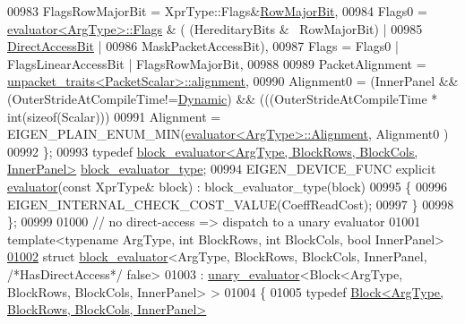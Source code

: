 \begin{DoxyCode}
00983     FlagsRowMajorBit = XprType::Flags&\hyperlink{group__flags_gae4f56c2a60bbe4bd2e44c5b19cbe8762}{RowMajorBit},
00984     Flags0 = \hyperlink{struct_eigen_1_1internal_1_1evaluator}{evaluator<ArgType>::Flags} & ( (HereditaryBits & ~RowMajorBit) |
00985                                            \hyperlink{group__flags_gabf1e9d0516a933445a4c307ad8f14915}{DirectAccessBit} |
00986                                            MaskPacketAccessBit),
00987     Flags = Flags0 | FlagsLinearAccessBit | FlagsRowMajorBit,
00988     
00989     PacketAlignment = \hyperlink{struct_eigen_1_1internal_1_1unpacket__traits}{unpacket\_traits<PacketScalar>::alignment},
00990     Alignment0 = (InnerPanel && (OuterStrideAtCompileTime!=\hyperlink{namespace_eigen_ad81fa7195215a0ce30017dfac309f0b2}{Dynamic}) && (((OuterStrideAtCompileTime *
       int(\textcolor{keyword}{sizeof}(Scalar))) %
00991     Alignment = EIGEN\_PLAIN\_ENUM\_MIN(\hyperlink{struct_eigen_1_1internal_1_1evaluator}{evaluator<ArgType>::Alignment}, Alignment0
      )
00992   \};
00993   \textcolor{keyword}{typedef} \hyperlink{struct_eigen_1_1internal_1_1block__evaluator}{block\_evaluator<ArgType, BlockRows, BlockCols, InnerPanel>}
       \hyperlink{struct_eigen_1_1internal_1_1block__evaluator}{block\_evaluator\_type};
00994   EIGEN\_DEVICE\_FUNC \textcolor{keyword}{explicit} \hyperlink{struct_eigen_1_1internal_1_1evaluator}{evaluator}(\textcolor{keyword}{const} XprType& block) : block\_evaluator\_type(block)
00995   \{
00996     EIGEN\_INTERNAL\_CHECK\_COST\_VALUE(CoeffReadCost);
00997   \}
00998 \};
00999 
01000 \textcolor{comment}{// no direct-access => dispatch to a unary evaluator}
01001 \textcolor{keyword}{template}<\textcolor{keyword}{typename} ArgType, \textcolor{keywordtype}{int} BlockRows, \textcolor{keywordtype}{int} BlockCols, \textcolor{keywordtype}{bool} InnerPanel>
\hyperlink{struct_eigen_1_1internal_1_1block__evaluator_3_01_arg_type_00_01_block_rows_00_01_block_cols_00_01_inner_panel_00_01false_01_4}{01002} \textcolor{keyword}{struct }\hyperlink{struct_eigen_1_1internal_1_1block__evaluator}{block\_evaluator}<ArgType, BlockRows, BlockCols, InnerPanel, \textcolor{comment}{/*HasDirectAccess*/} false>
01003   : \hyperlink{struct_eigen_1_1internal_1_1unary__evaluator}{unary\_evaluator}<Block<ArgType, BlockRows, BlockCols, InnerPanel> >
01004 \{
01005   \textcolor{keyword}{typedef} \hyperlink{group___core___module_class_eigen_1_1_block}{Block<ArgType, BlockRows, BlockCols, InnerPanel>} 

\end{DoxyCode}
